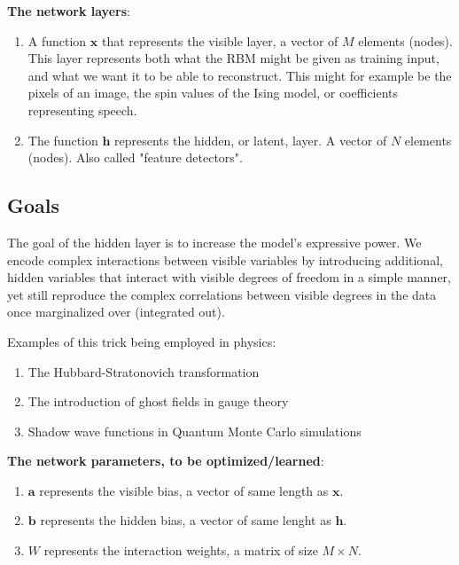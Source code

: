 \documentclass[%
oneside,                 %
final,                   %
10pt]{article}
\begin{document}
\textbf{The network layers}:
\begin{enumerate}
 \item A function $\mathbf{x}$ that represents the visible layer, a vector of $M$ elements (nodes). This layer represents both what the RBM might be given as training input, and what we want it to be able to reconstruct. This might for example be the pixels of an image, the spin values of the Ising model, or coefficients representing speech.

 \item The function $\mathbf{h}$ represents the hidden, or latent, layer. A vector of $N$ elements (nodes). Also called "feature detectors".
\end{enumerate}

\noindent
\subsection{Goals}

The goal of the hidden layer is to increase the model's expressive power. We encode complex interactions between visible variables by introducing additional, hidden variables that interact with visible degrees of freedom in a simple manner, yet still reproduce the complex correlations between visible degrees in the data once marginalized over (integrated out).

Examples of this trick being employed in physics: 
\begin{enumerate}
 \item The Hubbard-Stratonovich transformation

 \item The introduction of ghost fields in gauge theory

 \item Shadow wave functions in Quantum Monte Carlo simulations
\end{enumerate}

\noindent
\textbf{The network parameters, to be optimized/learned}:
\begin{enumerate}
 \item $\mathbf{a}$ represents the visible bias, a vector of same length as $\mathbf{x}$.

 \item $\mathbf{b}$ represents the hidden bias, a vector of same lenght as $\mathbf{h}$.

 \item $W$ represents the interaction weights, a matrix of size $M\times N$.
\end{enumerate}
\end{document}
